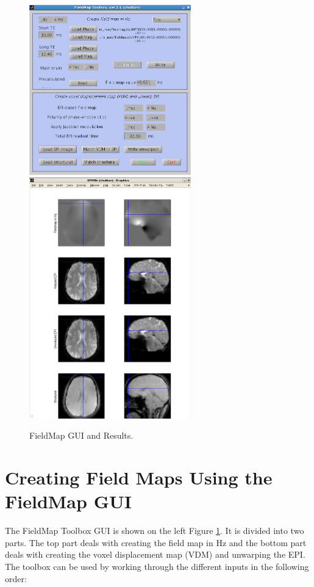 \begin{figure}
\begin{center}
\includegraphics[width=70mm]{FieldMap/fieldmap_gui1}
\includegraphics[width=70mm]{FieldMap/fieldmap_results1}
\end{center}
\caption{FieldMap GUI and Results. \label{FM2}}
\end{figure}

\section{Creating Field Maps Using the FieldMap GUI}
The FieldMap Toolbox GUI is shown on the left Figure \ref{FM2}. It is divided into two parts. The top part deals with creating the field map in Hz and the bottom part deals with creating the voxel displacement map (VDM) and unwarping the EPI. The toolbox can be used by working through the different inputs in the following order:

